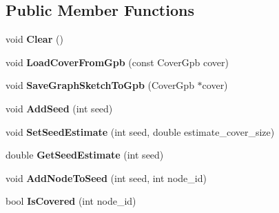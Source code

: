 \subsection*{Public Member Functions}
\begin{DoxyCompactItemize}
\item 
\hypertarget{classall__distance__sketch_1_1Cover_a0703d46dbcfb9f8a9613e1a812ac24af}{}void {\bfseries Clear} ()\label{classall__distance__sketch_1_1Cover_a0703d46dbcfb9f8a9613e1a812ac24af}

\item 
\hypertarget{classall__distance__sketch_1_1Cover_a8c12543eb52fcfe04ffc5499811523dd}{}void {\bfseries Load\+Cover\+From\+Gpb} (const Cover\+Gpb cover)\label{classall__distance__sketch_1_1Cover_a8c12543eb52fcfe04ffc5499811523dd}

\item 
\hypertarget{classall__distance__sketch_1_1Cover_afd0c85bdb247c60c376e20ae4ce18ee2}{}void {\bfseries Save\+Graph\+Sketch\+To\+Gpb} (Cover\+Gpb $\ast$cover)\label{classall__distance__sketch_1_1Cover_afd0c85bdb247c60c376e20ae4ce18ee2}

\item 
\hypertarget{classall__distance__sketch_1_1Cover_a91636b2e6a4df8339448ead2781f862f}{}void {\bfseries Add\+Seed} (int seed)\label{classall__distance__sketch_1_1Cover_a91636b2e6a4df8339448ead2781f862f}

\item 
\hypertarget{classall__distance__sketch_1_1Cover_afb619d47213da014e2a46041dd267ca1}{}void {\bfseries Set\+Seed\+Estimate} (int seed, double estimate\+\_\+cover\+\_\+size)\label{classall__distance__sketch_1_1Cover_afb619d47213da014e2a46041dd267ca1}

\item 
\hypertarget{classall__distance__sketch_1_1Cover_a9a0b15d23416014c8d5a7ee01f966a8e}{}double {\bfseries Get\+Seed\+Estimate} (int seed)\label{classall__distance__sketch_1_1Cover_a9a0b15d23416014c8d5a7ee01f966a8e}

\item 
\hypertarget{classall__distance__sketch_1_1Cover_a2e28c97e046a454311f58a8f6737b5d5}{}void {\bfseries Add\+Node\+To\+Seed} (int seed, int node\+\_\+id)\label{classall__distance__sketch_1_1Cover_a2e28c97e046a454311f58a8f6737b5d5}

\item 
\hypertarget{classall__distance__sketch_1_1Cover_a7f40f29a281a0a61d675083103e8f5d2}{}bool {\bfseries Is\+Covered} (int node\+\_\+id)\label{classall__distance__sketch_1_1Cover_a7f40f29a281a0a61d675083103e8f5d2}


\end{DoxyCompactItemize}
